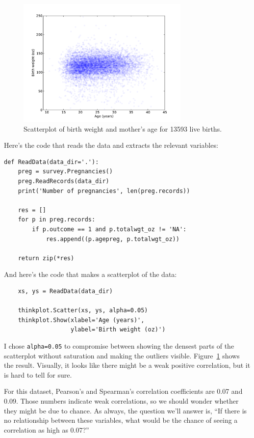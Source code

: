 \documentclass[12pt]{book}
\begin{document}
\begin{figure}
\centerline{\includegraphics[height=2.5in]{figs/correlate1.pdf}}
\caption{Scatterplot of birth weight and mother's age for 13593 live
births.}
\label{correlate1}
\end{figure}

Here's the code that reads the data and extracts the relevant
variables:

\begin{verbatim}
def ReadData(data_dir='.'):
    preg = survey.Pregnancies()
    preg.ReadRecords(data_dir)
    print('Number of pregnancies', len(preg.records))

    res = []
    for p in preg.records:
        if p.outcome == 1 and p.totalwgt_oz != 'NA':
            res.append((p.agepreg, p.totalwgt_oz))
    
    return zip(*res)
\end{verbatim}

And here's the code that makes a scatterplot of the data:

\begin{verbatim}
    xs, ys = ReadData(data_dir)

    thinkplot.Scatter(xs, ys, alpha=0.05)
    thinkplot.Show(xlabel='Age (years)',
                   ylabel='Birth weight (oz)')
\end{verbatim}

I chose {\tt alpha=0.05} to compromise between showing the densest
parts of the scatterplot without saturation and making the outliers
visible.  Figure~\ref{correlate1} shows the result.  Visually, it looks like
there might be a weak positive correlation, but it is hard to tell for sure.

For this dataset, Pearson's and Spearman's correlation coefficients
are 0.07 and 0.09.  Those numbers indicate weak correlations, so we
should wonder whether they might be due to chance.  As always, the question
we'll answer is, ``If there is no relationship between these variables,
what would be the chance of seeing a correlation as high as 0.07?''
\end{document}
